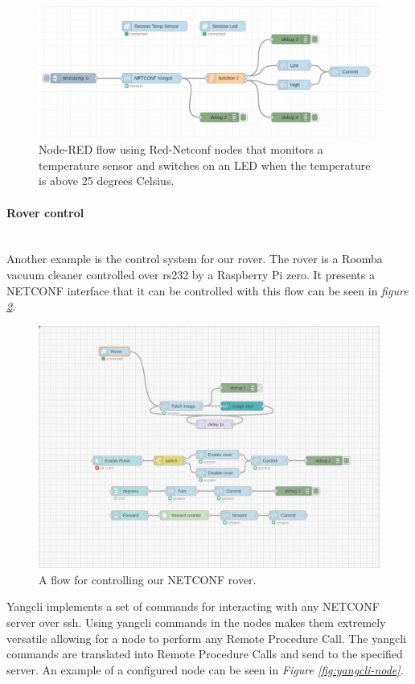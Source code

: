 \documentclass[12pt]{article}
\newcommand{\subsubsubsection}[1]{\paragraph{#1}\mbox{}\\}
\begin{document}
\newpage

\begin{figure}
  \centering
  \includegraphics[width=\textwidth]{red-netconf.png}
  \caption{Node-RED flow using Red-Netconf nodes that monitors a temperature sensor and 
  switches on an LED when the temperature is above 25 degrees Celsius.}
  \label{fig:red-netconf}
\end{figure}

\subsubsubsection{Rover control}
Another example is the control system for our rover. The rover is a Roomba vacuum cleaner controlled over rs232
by a Raspberry Pi zero. It presents a NETCONF interface that it can be controlled with this flow can be seen in 
\textit{figure \ref{fig:rover}}.

\begin{figure}
  \centering
  \includegraphics[width=\textwidth]{rover.png}
  \caption{A flow for controlling our NETCONF rover.}
  \label{fig:rover}
\end{figure}

\newpage

Yangcli \cite{YumaYangcliManual} implements a set of commands for interacting with any NETCONF server over ssh. 
Using yangcli commands in the nodes makes them extremely versatile allowing for a node to perform any Remote Procedure Call. 
The yangcli commands are translated into Remote Procedure Calls and send to the specified server. An example 
of a configured node can be seen in \textit{Figure \ref{fig:yangcli-node}}.
\end{document}

